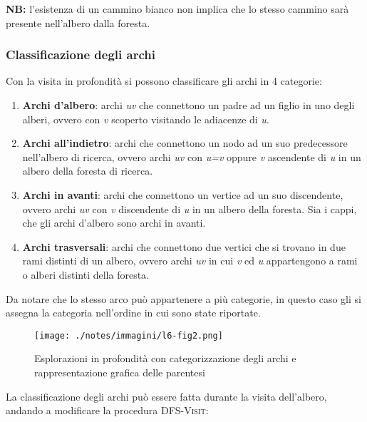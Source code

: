 \textbf{NB:} l'esistenza di un cammino bianco non implica che lo stesso
cammino sarà presente nell'albero dalla foresta.

\subsubsection{Classificazione degli archi}\label{classificazione-degli-archi}

Con la visita in profondità si possono classificare gli archi in 4
categorie:

\begin{enumerate}
\item
  \textbf{Archi d'albero}: archi \emph{uv} che connettono un padre ad un
  figlio in uno degli alberi, ovvero con \emph{v} scoperto visitando le
  adiacenze di \emph{u}.
\item
  \textbf{Archi all'indietro}: archi che connettono un nodo ad un suo
  predecessore nell'albero di ricerca, ovvero archi \emph{uv} con
  \emph{u=v} oppure \emph{v} ascendente di \emph{u} in un albero della
  foresta di ricerca.
\item
  \textbf{Archi in avanti}: archi che connettono un vertice ad un suo
  discendente, ovvero archi \emph{uv} con \emph{v} discendente di
  \emph{u} in un albero della foresta. Sia i cappi, che gli archi
  d'albero sono archi in avanti.
\item
  \textbf{Archi trasversali}: archi che connettono due vertici che si
  trovano in due rami distinti di un albero, ovvero archi \emph{uv} in
  cui \emph{v} ed \emph{u} appartengono a rami o alberi distinti della
  foresta.
\end{enumerate}

Da notare che lo stesso arco può appartenere a più categorie, in questo
caso gli si assegna la categoria nell'ordine in cui sono state
riportate.

\begin{figure}[htbp]
	\centering
	\texttt{[image: ./notes/immagini/l6-fig2.png]}
	\caption{Esplorazioni in profondità con categorizzazione degli archi e rappresentazione grafica delle parentesi}
\end{figure}

La classificazione degli archi può essere fatta durante la visita
dell'albero, andando a modificare la procedura \textsc{DFS-Visit}:

